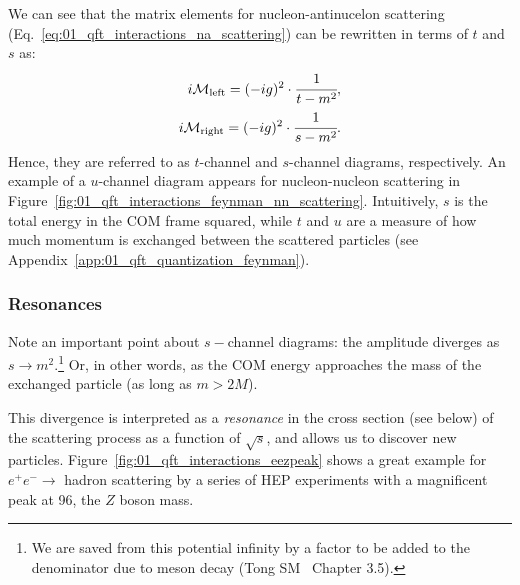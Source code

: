 We can see that the matrix elements for nucleon-antinucelon scattering (Eq.~\ref{eq:01_qft_interactions_na_scattering}) can be rewritten in terms of $t$ and $s$ as:
\begin{equation}
	\label{eq:01_qft_interactions_nn_tchannel_uchannel}
	\begin{split}
		i \mathcal M_{\mathrm{left}} = (-ig)^2 \cdot \cfrac{1}{t - m^2}, \\
		i \mathcal M_{\mathrm{right}} = (-ig)^2 \cdot \cfrac{1}{s - m^2}.
	\end{split}
\end{equation}
Hence, they are referred to as $t$-channel and $s$-channel diagrams, respectively.
An example of a $u$-channel diagram appears for nucleon-nucleon scattering in Figure~\ref{fig:01_qft_interactions_feynman_nn_scattering}.
Intuitively, $s$ is the total energy in the COM frame squared, while $t$ and $u$ are a measure of how much momentum is exchanged between the scattered particles (see Appendix~\ref{app:01_qft_quantization_feynman}).


\subsubsection{Resonances}

Note an important point about $s-$channel diagrams: the amplitude diverges as $s \rightarrow m^2$.\footnote{We are saved from this potential infinity by a factor to be added to the denominator due to meson decay (Tong SM~\cite{TongSM} Chapter 3.5).}
Or, in other words, as the COM energy approaches the mass of the exchanged particle (as long as $m > 2M$).

This divergence is interpreted as a \textit{resonance} in the cross section (see below) of the scattering process as a function of $\sqrt{s}$, and allows us to discover new particles.
Figure~\ref{fig:01_qft_interactions_eezpeak} shows a great example for $e^+e^- \rightarrow$ hadron scattering by a series of HEP experiments with a magnificent peak at 96\GeV, the $Z$ boson mass.

